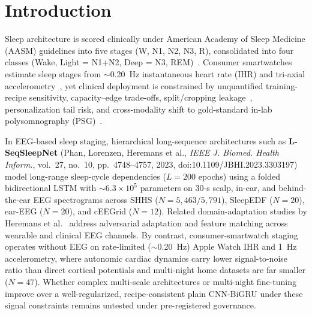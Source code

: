 \documentclass[journal]{IEEEtran}
\begin{document}
\section{Introduction}
Sleep architecture is scored clinically under American Academy of Sleep Medicine (AASM) guidelines into five stages (W, N1, N2, N3, R), consolidated into four classes (Wake, Light = N1+N2, Deep = N3, REM)~\cite{berry2020aasm}. Consumer smartwatches estimate sleep stages from $\sim$0.20~Hz instantaneous heart rate (IHR) and tri-axial accelerometry~\cite{song2026bidsleep,walch2019sleepaccel,vanderaar2025ppg,beattie2017ppg}, yet clinical deployment is constrained by unquantified training-recipe sensitivity, capacity--edge trade-offs, split/cropping leakage~\cite{brookshire2024leakage}, personalization tail risk, and cross-modality shift to gold-standard in-lab polysomnography (PSG)~\cite{bland1999agreement}.

In EEG-based sleep staging, hierarchical long-sequence architectures such as \textbf{L-SeqSleepNet} (Phan, Lorenzen, Heremans et al., \textit{IEEE J. Biomed. Health Inform.}, vol.~27, no.~10, pp.~4748--4757, 2023, doi:10.1109/JBHI.2023.3303197)~\cite{phan2023lseqsleepnet} model long-range sleep-cycle dependencies ($L=200$ epochs) using a folded bidirectional LSTM with $\sim 6.3\times 10^5$ parameters on 30-s scalp, in-ear, and behind-the-ear EEG spectrograms across SHHS ($N=5,463/5,791$), SleepEDF ($N=20$), ear-EEG ($N=20$), and cEEGrid ($N=12$). Related domain-adaptation studies by Heremans et al.~\cite{heremans2022adaptation,heremans2022feature} address adversarial adaptation and feature matching across wearable and clinical EEG channels. By contrast, consumer-smartwatch staging operates without EEG on rate-limited ($\sim$0.20~Hz) Apple Watch IHR and 1~Hz accelerometry, where autonomic cardiac dynamics carry lower signal-to-noise ratio than direct cortical potentials and multi-night home datasets are far smaller ($N=47$). Whether complex multi-scale architectures or multi-night fine-tuning improve over a well-regularized, recipe-consistent plain CNN-BiGRU under these signal constraints remains untested under pre-registered governance.
\end{document}
